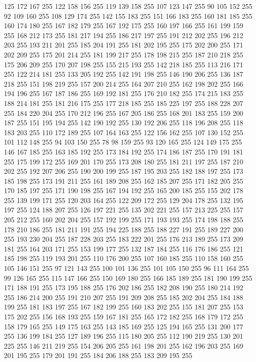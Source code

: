 125 172 167 255 122 158 156 255 119 139 158 255 107 123 147 255 90 105 152 255 92 109 160 255 108 129 174 255 142 155 183 255 151 166 183 255 160 181 185 255 160 174 180 255 167 182 179 255 167 192 175 255 160 197 166 255 161 199 159 255 168 212 173 255
181 217 194 255 186 217 197 255 191 212 202 255 196 212 203 255 193 211 201 255 185 204 191 255 181 202 195 255 175 202 200 255 171 202 209 255 175 201 214 255 181 199 217 255 178 198 215 255 187 210 218 255 175 206 209 255 170 207 198 255 155 215 193 255
142 218 185 255 113 216 171 255 122 214 181 255 133 205 192 255 142 191 198 255 146 190 206 255 136 187 218 255 151 198 219 255 157 200 214 255 164 207 210 255 162 198 202 255 166 194 196 255 167 187 186 255 169 192 181 255 176 210 182 255 174 215 183 255
188 214 181 255 181 216 175 255 177 218 185 255 185 225 197 255 188 228 207 255 184 220 204 255 170 212 196 255 167 205 186 255 168 201 183 255 159 200 187 255 151 195 194 255 142 190 192 255 130 192 206 255 118 196 208 255 118 183 203 255 110 172 189 255
107 164 163 255 122 156 162 255 107 130 152 255 101 112 148 255 94 103 150 255 78 98 159 255 93 120 165 255 124 149 175 255 146 167 185 255 163 185 192 255 173 184 192 255 174 186 187 255 170 191 181 255 175 199 172 255 169 201 170 255 173 208 180 255
181 211 197 255 187 210 202 255 192 207 206 255 190 200 199 255 187 195 203 255 182 188 197 255 173 185 198 255 173 191 211 255 161 189 208 255 162 185 207 255 171 182 205 255 170 185 197 255 171 190 198 255 167 194 192 255 165 200 185 255 155 202 178 255
139 199 171 255 120 203 164 255 122 209 172 255 129 204 178 255 132 195 197 255 124 188 207 255 126 197 221 255 135 202 221 255 157 213 225 255 157 205 212 255 160 202 204 255 157 192 199 255 171 193 193 255 174 198 188 255 178 210 186 255 181 211 191 255
194 225 188 255 188 227 191 255 189 227 200 255 193 230 204 255 187 228 203 255 183 222 201 255 176 213 189 255 173 209 181 255 164 203 171 255 153 199 177 255 132 187 184 255 116 176 186 255 121 185 198 255 119 193 201 255 110 176 200 255 107 160 185 255
110 158 160 255 105 146 151 255 97 121 143 255 100 101 136 255 101 105 150 255 96 111 164 255 99 126 165 255 115 147 166 255 150 169 180 255 166 185 189 255 181 190 199 255 171 188 191 255 173 195 188 255 176 202 186 255 182 208 190 255 180 214 192 255
186 214 200 255 191 210 207 255 191 209 208 255 185 202 204 255 184 188 199 255 181 183 197 255 167 182 199 255 160 183 202 255 155 181 207 255 153 175 202 255 156 168 193 255 159 167 181 255 165 172 182 255 168 179 172 255 158 179 165 255 149 175 163 255
143 185 169 255 125 194 165 255 131 200 177 255 136 199 184 255 127 189 196 255 115 180 205 255 112 190 219 255 130 201 225 255 146 211 219 255 154 206 205 255 161 198 201 255 162 196 203 255 169 201 195 255 179 201 191 255 184 206 188 255 183 209 195 255
